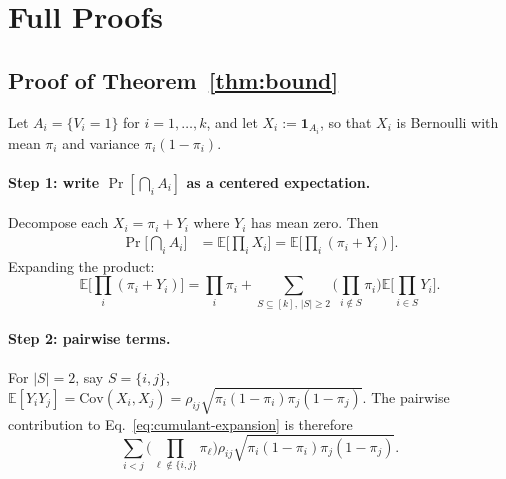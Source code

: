 
\section{Full Proofs}
\label{app:proofs}

\subsection{Proof of Theorem~\ref{thm:bound}}
\label{app:proof-thm1}

Let $A_i = \{V_i = 1\}$ for $i = 1, \ldots, k$, and let
$X_i := \mathbf{1}_{A_i}$, so that $X_i$ is Bernoulli with mean
$\pi_i$ and variance $\pi_i (1 - \pi_i)$.

\paragraph{Step 1: write $\Pr[\bigcap_i A_i]$ as a centered expectation.}
Decompose each $X_i = \pi_i + Y_i$ where $Y_i$ has mean zero. Then
\begin{align}
  \Pr\!\Big[\bigcap_i A_i\Big]
  &= \mathbb{E}\!\Big[\prod_i X_i\Big]
  = \mathbb{E}\!\Big[\prod_i (\pi_i + Y_i)\Big]. \nonumber
\end{align}
Expanding the product:
\begin{equation}
  \mathbb{E}\!\Big[\prod_i (\pi_i + Y_i)\Big]
  = \prod_i \pi_i
  + \sum_{S \subseteq [k],\, |S| \geq 2}
    \Big(\prod_{i \notin S} \pi_i\Big)
    \mathbb{E}\!\Big[\prod_{i \in S} Y_i\Big].
  \label{eq:cumulant-expansion}
\end{equation}

\paragraph{Step 2: pairwise terms.}
For $|S| = 2$, say $S = \{i, j\}$,
$\mathbb{E}[Y_i Y_j] = \mathrm{Cov}(X_i, X_j) = \rho_{ij}\sqrt{\pi_i(1-\pi_i)\pi_j(1-\pi_j)}$.
The pairwise contribution to Eq.~\ref{eq:cumulant-expansion} is therefore
\begin{equation}
  \sum_{i<j} \Big(\prod_{\ell \notin \{i,j\}} \pi_\ell\Big)
    \rho_{ij}\sqrt{\pi_i(1-\pi_i)\pi_j(1-\pi_j)}.
  \label{eq:pairwise-sum}
\end{equation}

